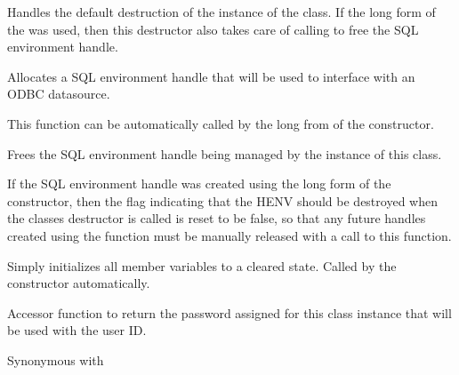 \label{wxdbconnectinfdestr}


Handles the default destruction of the instance of the class.  If the long form
of the  was used, then this destructor
also takes care of calling\rtfsp
{} to free the
SQL environment handle.

\label{wxdbconnectinfallochenv}


Allocates a SQL environment handle that will be used to interface with
an ODBC datasource.


This function can be automatically called by the long from of the
 constructor.

\label{wxdbconnectinffreehenv}


Frees the SQL environment handle being managed by the instance of this class.


If the SQL environment handle was created using the long form of the\rtfsp
{} constructor, then the flag indicating
that the HENV should be destroyed when the classes destructor is called
is reset to be false, so that any future handles created using the\rtfsp
{} function
must be manually released with a call to this function.

\label{wxdbconnectinfinitialize}

Simply initializes all member variables to a cleared state.  Called by
the constructor automatically.

\label{wxdbconnectinfgetauthstr}


Accessor function to return the password assigned for this class
instance that will be used with the user ID.

Synonymous with 

